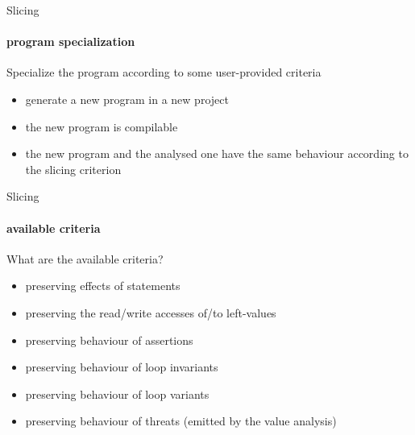\documentclass{beamer}
\newcommand{\orange}[1]{{\textcolor{frama-c-1}{#1}}}
\newcommand{\orangepale}[1]{{\textcolor{frama-c-2}{#1}}}
\newcommand{\vvert}[1]{{\textcolor{vert}{#1}}}
\newcommand{\goup}{\vspace{-5pt}}
\newcommand{\intro}[1]{\begin{center}\vvert{#1}\end{center}}
\newenvironment{sect}[1]{\orange{#1}\begin{itemize}}{\end{itemize}}
\newenvironment{features}{\begin{sect}{Features}}{\end{sect}}
\begin{document}

\begin{frame}{Slicing}
  \framesubtitle{program specialization}

  \intro{Specialize the program according to some user-provided criteria}

\begin{features}
\item generate a new program in a new project
\item the new program is compilable
\item the new program and the analysed one have the same behaviour according to
  the slicing criterion
\end{features}

\end{frame}


\begin{frame}{Slicing}
\framesubtitle{available criteria}

\goup
\intro{What are the available criteria?}

\begin{sect}{Criteria for code observation}
\item preserving effects of \orangepale{statements}
\item preserving the \orangepale{read/write accesses} of/to left-values
\end{sect}\medskip

\begin{sect}{Criteria for proving properties}
\item preserving behaviour of \orangepale{assertions}
\item preserving behaviour of \orangepale{loop invariants}
\item preserving behaviour of \orangepale{loop variants}
\item preserving behaviour of \orangepale{threats} (emitted by the value
  analysis)
\end{sect}

\end{frame}

\end{document}
